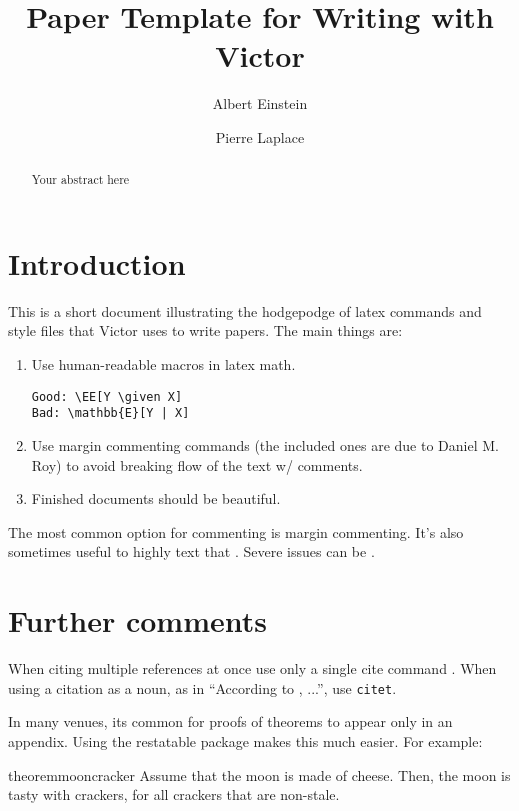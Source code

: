 \documentclass{article}
\title{Paper Template for Writing with Victor}
\date{}
\author[1]{Albert Einstein}
\author[1,2]{Pierre Laplace}
\affil[1]{Physical Insitute of the Beyond}
\affil[2]{Ouija Statistical Institute}
\begin{document}
\maketitle

\begin{abstract}
Your abstract here
\end{abstract}

\section{Introduction}

This is a short document illustrating the hodgepodge of latex commands and style files that Victor uses to write papers.
The main things are:
\begin{enumerate}
\item Use human-readable macros in latex math.
  
\begin{verbatim}
Good: \EE[Y \given X]
Bad: \mathbb{E}[Y | X]
\end{verbatim}
\item Use margin commenting commands (the included ones are due to Daniel M. Roy) to avoid breaking flow of the text w/ comments.
\item Finished documents should be beautiful.
\end{enumerate}

The most common option for commenting is margin commenting.
It's also sometimes useful to highly text that .
Severe issues can be .

\section{Further comments}
When citing multiple references at once use only a single cite command \cite[e.g,][]{Richardson:Hudgens:Gilbert:Fine:2014, Liu:Kuramoto:Stuart:2013}.
When using a citation as a noun, as in ``According to \citet{Rosenbaum:2010}, ...'', use \texttt{citet}.

In many venues, its common for proofs of theorems to appear only in an appendix. Using the restatable package makes this much easier. For example:
\begin{restatable}{theorem}{mooncracker}
\label{thm:mooncracker}
Assume that the moon is made of cheese. Then, the moon is tasty with crackers, for all crackers that are non-stale.
\end{restatable}
\end{document}
